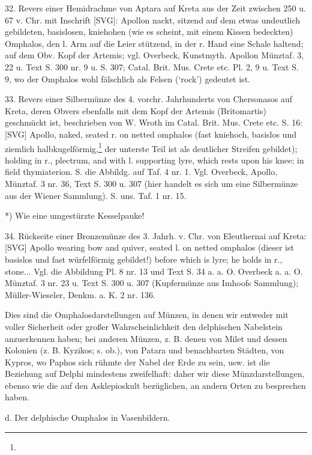 \documentclass[a4paper, 11pt, oneside]{article}
\begin{document}
32. Revers einer Hemidrachme von Aptara auf Kreta aus der Zeit zwischen 250 u. 67 v. Chr. mit Inschrift [SVG]: Apollon nackt, sitzend auf dem etwas undeutlich gebildeten, basislosen, kniehohen (wie es scheint, mit einem Kissen bedeckten) Omphalos, den l. Arm auf die Leier stützend, in der r. Hand eine Schale haltend; auf dem Obv. Kopf der Artemis; vgl. Overbeck, Kunstmyth. Apollon Münztaf. 3, 22 u. Text S. 300 nr. 9 u. S. 307; Catal. Brit. Mus. Crete etc. Pl. 2, 9 u. Text S. 9, wo der Omphalos wohl fälschlich als Felsen (`rock') gedeutet ist.

33. Revers einer Silbermünze des 4. vorchr. Jahrhunderts von Chersonasos auf Kreta, deren Obvers ebenfalls mit dem Kopf der Artemis (Britomartis) geschmückt ist, beschrieben von W. Wroth im Catal. Brit. Mus. Crete etc. S. 16: [SVG] Apollo, naked, seated r. on netted omphalos (fast kniehoch, basislos und ziemlich halbkugelförmig,\footnote{} der unterste Teil ist als deutlicher Streifen gebildet); holding in r., plectrum, and with l. supporting lyre, which rests upon his knee; in field thymiaterion. S. die Abbildg. auf Taf. 4 nr. 1. Vgl. Overbeck, Apollo, Münztaf. 3 nr. 36, Text S. 300 u. 307 (hier handelt es sich um eine Silbermünze aus der Wiener Sammlung). S. uns. Taf. 1 nr. 15.

*) Wie eine umgestürzte Kesselpauke!

34. Rückseite einer Bronzemünze des 3. Jahrh. v. Chr. von Eleuthernai auf Kreta: [SVG] Apollo wearing bow and quiver, seated l. on netted omphalos (dieser ist basislos und fast würfelförmig gebildet!) before which is lyre; he holds in r., stone... Vgl. die Abbildung Pl. 8 nr. 13 und Text S. 34 a. a. O. Overbeck a. a. O. Münztaf. 3 nr. 23 u. Text S. 300 u. 307 (Kupfermünze aus Imhoofs Sammlung); Müller-Wieseler, Denkm. a. K. 2 nr. 136.

Dies sind die Omphalosdarstellungen auf Münzen, in denen wir entweder mit voller Sicherheit oder großer Wahrscheinlichkeit den delphischen Nabelstein anzuerkennen haben; bei anderen Münzen, z. B. denen von Milet und dessen Kolonien (z. B. Kyzikos; s. ob.), von Patara und benachbarten Städten, von Kypros, wo Paphos sich rühmte der Nabel der Erde zu sein, usw. ist die Beziehung auf Delphi mindestens zweifelhaft: daher wir diese Münzdarstellungen, ebenso wie die auf den Asklepioskult bezüglichen, an andern Orten zu besprechen haben.

d. Der delphische Omphalos in Vasenbildern.
\end{document}
